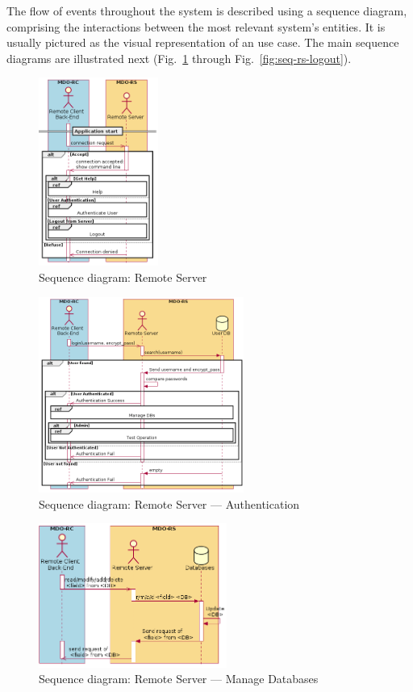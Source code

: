 The flow of events throughout the system is described using a sequence diagram, comprising the interactions between the most relevant system's entities.
It is usually pictured as the visual representation of an use case. The main
sequence diagrams are illustrated next (Fig.~\ref{fig:seq-rs-general} through Fig.~\ref{fig:seq-rs-logout}).
%
%
\begin{figure}[htb!]
  \centering
  \includegraphics[width=0.35\textwidth]{img/seq-rs-general.png}%
  \caption{Sequence diagram: Remote Server}%
  \label{fig:seq-rs-general}
\end{figure}
%
\begin{figure}[htb!]
  \centering
  \includegraphics[width=0.6\textwidth]{img/seq-rs-authenticate.png}%
  \caption{Sequence diagram: Remote Server --- Authentication}%
  \label{fig:seq-rs-authenticate}
\end{figure}

\begin{figure}[htb!]
  \centering
  \includegraphics[width=0.55\textwidth]{img/seq-rs-manage-dbs.png}%
  \caption{Sequence diagram: Remote Server --- Manage Databases}%
  \label{fig:seq-rs-manage-dbs}
\end{figure}

